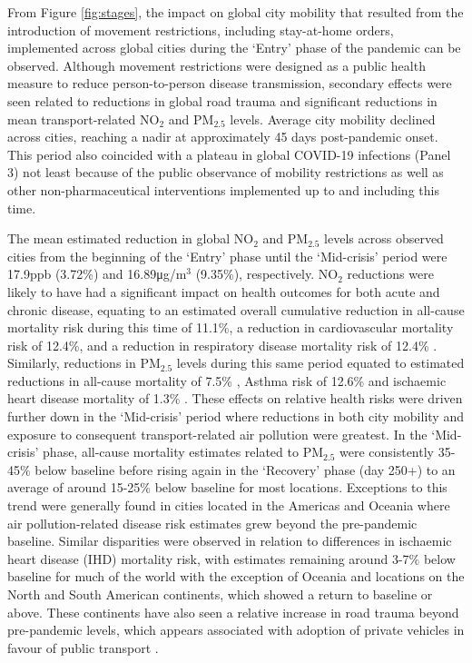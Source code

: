 \documentclass[preprint,10pt]{elsarticle} %
\begin{document}
From Figure \ref{fig:stages}, the impact on global city mobility that resulted from the introduction of movement restrictions, including stay-at-home orders, implemented across global cities during the `Entry' phase\cite{hale2021global} of the pandemic can be observed. Although movement restrictions were designed as a public health measure to reduce person-to-person disease transmission, secondary effects were seen related to reductions in global road trauma \cite{ITFRS2023} and significant reductions in mean transport-related NO$_{2}$ and PM$_{2.5}$ levels\cite{zhang2023impact}. Average city mobility declined across cities, reaching a nadir at approximately 45 days post-pandemic onset. This period also coincided with a plateau in global COVID-19 infections (Panel 3) not least because of the public observance of mobility restrictions as well as other non-pharmaceutical interventions implemented up to and including this time\cite{hale2021global}. 

The mean estimated reduction in global NO$_{2}$ and PM$_{2.5}$ levels across observed cities from the beginning of the `Entry' phase until the `Mid-crisis' period were 17.9ppb (3.72\%) and 16.89\si{\micro\gram}/m$^{3}$ (9.35\%), respectively. NO$_{2}$ reductions were likely to have had a significant impact on health outcomes for both acute and chronic disease, equating to an estimated overall cumulative reduction in all-cause mortality risk during this time of 11.1\%, a reduction in cardiovascular mortality risk of 12.4\%, and a reduction in respiratory disease mortality risk of 12.4\% \cite{Huang19Pollution}. Similarly, reductions in PM$_{2.5}$ levels during this same period equated to estimated reductions in all-cause mortality of 7.5\% \cite{Yu2020PM2.5}, Asthma risk of 12.6\% and ischaemic heart disease mortality of 1.3\% \cite{Xie257}. These effects on relative health risks were driven further down in the `Mid-crisis' period where reductions in both city mobility and exposure to consequent transport-related air pollution were greatest. In the `Mid-crisis' phase, all-cause mortality estimates related to PM$_{2.5}$ were consistently 35-45$\%$ below baseline before rising again in the `Recovery' phase (day 250+) to an average of around 15-25$\%$ below baseline for most locations. Exceptions to this trend were generally found in cities located in the Americas and Oceania where air pollution-related disease risk estimates grew beyond the pre-pandemic baseline. Similar disparities were observed in relation to differences in ischaemic heart disease (IHD) mortality risk, with estimates remaining around 3-7$\%$ below baseline for much of the world with the exception of Oceania and locations on the North and South American continents, which showed a return to baseline or above. These continents have also seen a relative increase in road trauma beyond pre-pandemic levels, which appears associated with adoption of private vehicles in favour of public transport \cite{ITFRS2023,saladie2023back,DAS20211}. 
\end{document}
